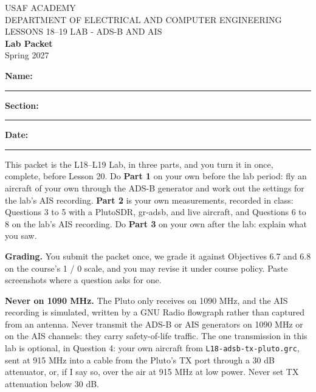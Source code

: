 \documentclass{exam}
\def\thisterm{\thisTermIn}
\def\thisterm{Spring 2027}
\begin{document}
\pagestyle{headandfoot}   %


\begin{center}
USAF ACADEMY \\
DEPARTMENT OF ELECTRICAL AND COMPUTER ENGINEERING \\
LESSONS 18--19 LAB - ADS-B AND AIS \\
\textbf{Lab Packet} \\
\thisterm \\[4mm]
\end{center}

\vspace{-4pt}
\textbf{Name:} \rule[-2pt]{2.6in}{0.4pt} \hfill
\textbf{Section:} \rule[-2pt]{0.9in}{0.4pt} \hfill
\textbf{Date:} \rule[-2pt]{1.1in}{0.4pt}

\vspace{4pt}


\vspace{2pt}

This packet is the L18--L19 Lab, in three parts, and you turn it in once, complete,
before Lesson 20. Do \textbf{Part 1} on your own before the lab period: fly an aircraft of your
own through the ADS-B generator and work out the settings for the lab's AIS recording. \textbf{Part 2} is your
own measurements, recorded in class: Questions 3 to 5 with a PlutoSDR, gr-adsb, and live aircraft,
and Questions 6 to 8 on the lab's AIS recording. Do \textbf{Part 3} on your own after the
lab: explain what you saw.

\textbf{Grading.} You submit the packet once, we grade it against Objectives 6.7 and 6.8
on the course's 1 / 0 scale, and you may revise it under course policy. Paste screenshots
where a question asks for one.

\textbf{Never on 1090 MHz.} The Pluto only receives on 1090 MHz, and the AIS recording is
simulated, written by a GNU Radio flowgraph rather than captured from an antenna. Never
transmit the ADS-B or AIS generators on 1090 MHz or on the AIS channels: they carry
safety-of-life traffic. The one transmission in this lab is optional, in Question 4: your
own aircraft from \texttt{L18-adsb-tx-pluto.grc}, sent at 915 MHz into a cable from the
Pluto's TX port through a 30 dB attenuator, or, if I say so, over the air at
915 MHz at low power. Never set TX attenuation below 30 dB.
\end{document}
